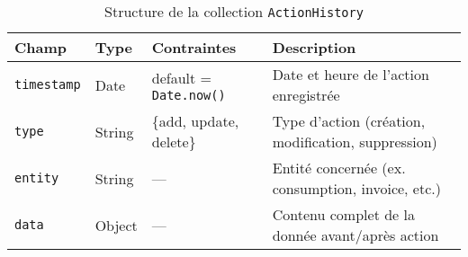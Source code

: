 \documentclass[a4paper,11pt]{report}
\begin{document}
\begin{table}[ht]
  \centering
  \small
  \caption{Structure de la collection \texttt{ActionHistory}}
  \label{tab:actionhistory-schema}
  \begin{tabularx}{\textwidth}{l X l X}
    \toprule
    \bf Champ       & \bf Type    & \bf Contraintes                  & \bf Description                                    \\
    \midrule
    \texttt{timestamp} & Date     & default = \texttt{Date.now()}     & Date et heure de l’action enregistrée              \\
    \addlinespace
    \texttt{type}      & String   & \{add, update, delete\}           & Type d’action (création, modification, suppression)\\
    \addlinespace
    \texttt{entity}    & String   & —                                 & Entité concernée (ex. consumption, invoice, etc.)  \\
    \addlinespace
    \texttt{data}      & Object   & —                                 & Contenu complet de la donnée avant/après action     \\
    \bottomrule
  \end{tabularx}
\end{table}

\vspace{1em}
\end{document}
